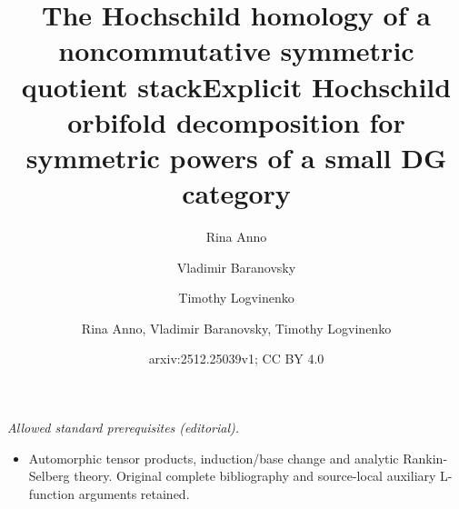 \documentclass[12pt,a4paper,reqno]{amsart}
\title[Hochschild homology of nc symmetric quotient stack]{The Hochschild homology of a noncommutative symmetric quotient stack}
\author{Rina Anno}
\author{Vladimir Baranovsky}
\author{Timothy Logvinenko}
\title{Explicit Hochschild orbifold decomposition for symmetric powers of a small DG category}
\author{Rina Anno, Vladimir Baranovsky, Timothy Logvinenko}
\date{arxiv:2512.25039v1; CC BY 4.0}
\DeclareMathOperator{\picr}{Pic}
\DeclareMathOperator{\cl}{Cl}
\DeclareMathOperator{\modd}{\bf Mod}
\DeclareMathOperator{\opp}{{opp}}
\begin{document}
\maketitle
\noindent\textit{Allowed standard prerequisites (editorial).}\begin{itemize}
\item Automorphic tensor products, induction/base change and analytic Rankin-Selberg theory. Original complete bibliography and source-local auxiliary L-function arguments retained.
\end{itemize}\medskip
\def\bv{\mathbf{v}}
\def\kgc_{K^*_G(\mathbb{C}^n)}
\def\kgchi_{K^*_\chi(\mathbb{C}^n)}
\def\kgcf_{K_G(\mathbb{C}^n)}
\def\kgchif_{K_\chi(\mathbb{C}^n)}
\def\gpic_{G\text{-}\picr}
\def\gcl_{G\text{-}\cl}
\def\trch_{{\chi_{0}}}
\def\regring{{R}}
\def\regrep{{V_{\text{reg}}}}
\def\givrep{{V_{\text{giv}}}}
\def\lbar{{(\mathbb{Z}^n)^\vee}}
\def\genpx_{{p_X}}
\def\genpy_{{p_Y}}
\def\genpcn_{p_{\mathbb{C}^n}}
\def\gnat{gnat}
\def\twalg{{\regring \rtimes G}}
\def\L{{\mathcal{L}}}
\def\gcd{\mbox{gcd}}
\def\lcm{\mbox{lcm}}
\def\tf{{\tilde{f}}}
\def\tD{{\tilde{D}}}
\def\A{{\mathcal{A}}}
\def\B{{\mathcal{B}}}
\def\C{{\mathcal{C}}}
\def\D{{\mathcal{D}}}
\def\F{{\mathcal{F}}}
\def\H{{\mathcal{H}}}
\def\L{{\mathcal{L}}}
\def\M{{\mathcal{M}}}
\def\N{{\mathcal{N}}}
\def\R{{\mathcal{R}}}
\def\T{{\mathcal{T}}}
\def\RF{{\mathcal{R}\mathcal{F}}}
\def\barA{{\bar{\mathcal{A}}}}
\def\barAi{{\bar{\mathcal{A}}_1}}
\def\barAj{{\bar{\mathcal{A}}_2}}
\def\barB{{\bar{\mathcal{B}}}}
\def\barC{{\bar{\mathcal{C}}}}
\def\barD{{\bar{\mathcal{D}}}}
\def\barT{{\bar{\mathcal{T}}}}
\def\barM{{\bar{\mathcal{M}}}}
\def\Aopp{{\A^{\opp}}}
\def\Bopp{{\B^{\opp}}}
\def\Copp{{\C^{\opp}}}
\def\aA{\leftidx{_{a}}{\A}}
\def\bA{\leftidx{_{b}}{\A}}
\def\Aa{{\A_a}}
\def\Ea{E_a}
\def\aE{\leftidx{_{a}}{E}{}}
\def\Eb{E_b}
\def\bE{\leftidx{_{b}}{E}{}}
\def\Fa{F_a}
\def\aF{\leftidx{_{a}}{F}{}}
\def\Fb{F_b}
\def\bF{\leftidx{_{b}}{F}{}}
\def\aM{\leftidx{_{a}}{M}{}}
\def\aN{\leftidx{_{a}}{N}{}}
\def\aMb{\leftidx{_{a}}{M}{_{b}}}
\def\aNb{\leftidx{_{a}}{N}{_{b}}}
\def\rfRFa{\leftidx{_{\RF}}{\RF}{_{\A}}}
\def\aRFrf{\leftidx{_{\A}}{\RF}{_{\RF}}}
\def\biAMA{\leftidx{_{\A}}{M}{_{\A}}}
\def\biAMC{\leftidx{_{\A}}{M}{_{\C}}}
\def\biCMA{\leftidx{_{\C}}{M}{_{\A}}}
\def\biCMC{\leftidx{_{\C}}{M}{_{\C}}}
\def\biALA{\leftidx{_{\A}}{L}{_{\A}}}
\def\biALC{\leftidx{_{\A}}{L}{_{\C}}}
\def\biCLA{\leftidx{_{\C}}{L}{_{\A}}}
\def\biCLC{\leftidx{_{\C}}{L}{_{\C}}}
\def\Na{{N_a}}
\def\modk{{\modd\text{-}\mathbb{k}}}
\def\Amod{{\A\text{-}\modd}}
\def\modA{{\modd\text{-}\A}}
\def\modbar{{\overline{\modd}}}
\end{document}
